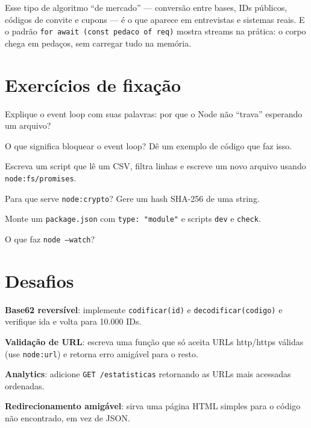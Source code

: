 \begin{caixadica}
Esse tipo de algoritmo ``de mercado'' — conversão entre bases, IDs públicos,
códigos de convite e cupons — é o que aparece em entrevistas e sistemas
reais. E o padrão \texttt{for await (const pedaco of req)} mostra streams na
prática: o corpo chega em pedaços, sem carregar tudo na memória.
\end{caixadica}

\section{Exercícios de fixação}

\begin{exercicios}
  \item Explique o event loop com suas palavras: por que o Node não ``trava'' esperando um arquivo?
  \item O que significa bloquear o event loop? Dê um exemplo de código que faz isso.
  \item Escreva um script que lê um CSV, filtra linhas e escreve um novo arquivo usando \texttt{node:fs/promises}.
  \item Para que serve \texttt{node:crypto}? Gere um hash SHA-256 de uma string.
  \item Monte um \texttt{package.json} com \texttt{type: "module"} e scripts \texttt{dev} e \texttt{check}.
  \item O que faz \texttt{node --watch}?
\end{exercicios}

\section{Desafios}

\begin{desafios}
  \item \textbf{Base62 reversível}: implemente \texttt{codificar(id)} e \texttt{decodificar(codigo)} e verifique ida e volta para 10.000 IDs.
  \item \textbf{Validação de URL}: escreva uma função que só aceita URLs http/https válidas (use \texttt{node:url}) e retorna erro amigável para o resto.
  \item \textbf{Analytics}: adicione \texttt{GET /estatisticas} retornando as URLs mais acessadas ordenadas.
  \item \textbf{Redirecionamento amigável}: sirva uma página HTML simples para o código não encontrado, em vez de JSON.
\end{desafios}

